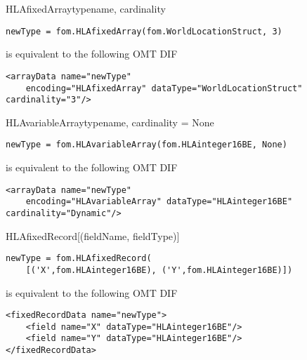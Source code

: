 \begin{classdesc}{HLAfixedArray}{typename, cardinality}
\begin{verbatim}
newType = fom.HLAfixedArray(fom.WorldLocationStruct, 3)
\end{verbatim}
is equivalent to the following OMT DIF
\begin{verbatim}
<arrayData name="newType"
    encoding="HLAfixedArray" dataType="WorldLocationStruct" cardinality="3"/>
\end{verbatim}
\end{classdesc}

\begin{classdesc}{HLAvariableArray}{typename, cardinality = None}
\begin{verbatim}
newType = fom.HLAvariableArray(fom.HLAinteger16BE, None)
\end{verbatim}
is equivalent to the following OMT DIF
\begin{verbatim}
<arrayData name="newType"
    encoding="HLAvariableArray" dataType="HLAinteger16BE" cardinality="Dynamic"/>
\end{verbatim}
\end{classdesc}

\begin{classdesc}{HLAfixedRecord}{[(fieldName, fieldType)]}
\begin{verbatim}
newType = fom.HLAfixedRecord(
    [('X',fom.HLAinteger16BE), ('Y',fom.HLAinteger16BE)])
\end{verbatim}
is equivalent to the following OMT DIF
\begin{verbatim}
<fixedRecordData name="newType">
    <field name="X" dataType="HLAinteger16BE"/>
    <field name="Y" dataType="HLAinteger16BE"/>
</fixedRecordData>
\end{verbatim}
\end{classdesc}

